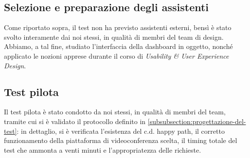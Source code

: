 \subsection{Selezione e preparazione degli assistenti}
Come riportato sopra, il test non ha previsto assistenti esterni, bensì è stato svolto interamente dai noi stessi, in qualità di membri del team di design. Abbiamo, a tal fine, studiato l'interfaccia della dashboard in oggetto, nonché applicato le nozioni apprese durante il corso di \textit{Usability \& User Experience Design}.

\subsection{Test pilota}
Il test pilota è stato condotto da noi stessi, in qualità di membri del team, tramite cui si è validato il protocollo definito in \ref{subsubsection:progettazione-del-test}: in dettaglio, si è verificata l'esistenza del c.d. happy path, il corretto funzionamento della piattaforma di videoconferenza scelta, il timing totale del test che ammonta a venti minuti e l'appropriatezza delle richieste.

